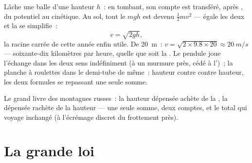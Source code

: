 \begin{example}\label{ex:g9:energy-conversions:trade}
Lâche une balle d'une hauteur $h$~: en tombant, son compte est
transféré,  après , du potentiel au cinétique. Au sol, tout
le $m g h$ est devenu $\frac12 m v^2$ --- égale les deux et la 
se simplifie~:
\[
v = \sqrt{2 g h},
\]
la racine carrée de cette année enfin utile. De \qty{20}{m}~:
$v = \sqrt{2 \times 9.8 \times 20} \approx \qty{20}{m/s}$ ---
soixante-dix kilomètres par heure, quelle que soit la . Le
pendule joue l'échange dans les deux sens indéfiniment (à un murmure
près, cédé à l')~; la planche à roulettes dans le demi-tube de
même~: hauteur contre  contre hauteur, les deux formules se
repassant une seule somme.
\end{example}

\begin{omfigure}

{\small Le grand livre des montagnes russes~: la hauteur dépensée
achète de la , la  dépensée rachète de la hauteur ---
une seule somme, deux comptes, et le total qui voyage inchangé (à
l'écrémage discret du frottement près).}
\end{omfigure}

\section{La grande loi}

